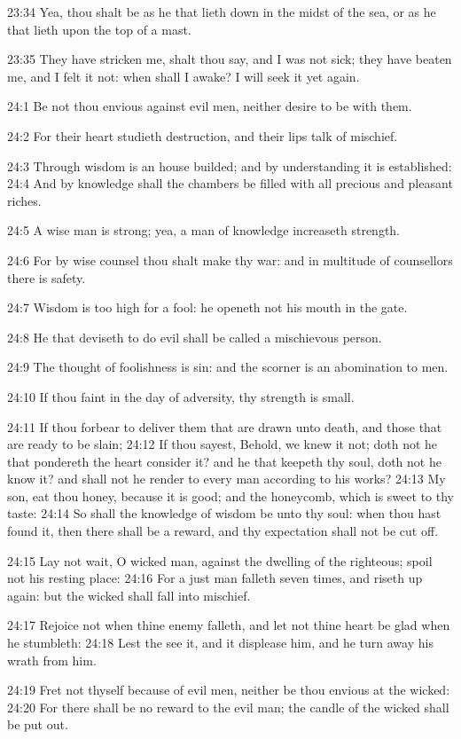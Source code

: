 23:34 Yea, thou shalt be as he that lieth down in the midst of the sea, or as he that lieth upon the top of a mast.

23:35 They have stricken me, shalt thou say, and I was not sick; they have beaten me, and I felt it not: when shall I awake? I will seek it yet again.

24:1 Be not thou envious against evil men, neither desire to be with them.

24:2 For their heart studieth destruction, and their lips talk of mischief.

24:3 Through wisdom is an house builded; and by understanding it is established: 24:4 And by knowledge shall the chambers be filled with all precious and pleasant riches.

24:5 A wise man is strong; yea, a man of knowledge increaseth strength.

24:6 For by wise counsel thou shalt make thy war: and in multitude of counsellors there is safety.

24:7 Wisdom is too high for a fool: he openeth not his mouth in the gate.

24:8 He that deviseth to do evil shall be called a mischievous person.

24:9 The thought of foolishness is sin: and the scorner is an abomination to men.

24:10 If thou faint in the day of adversity, thy strength is small.

24:11 If thou forbear to deliver them that are drawn unto death, and those that are ready to be slain; 24:12 If thou sayest, Behold, we knew it not; doth not he that pondereth the heart consider it? and he that keepeth thy soul, doth not he know it? and shall not he render to every man according to his works?  24:13 My son, eat thou honey, because it is good; and the honeycomb, which is sweet to thy taste: 24:14 So shall the knowledge of wisdom be unto thy soul: when thou hast found it, then there shall be a reward, and thy expectation shall not be cut off.

24:15 Lay not wait, O wicked man, against the dwelling of the righteous; spoil not his resting place: 24:16 For a just man falleth seven times, and riseth up again: but the wicked shall fall into mischief.

24:17 Rejoice not when thine enemy falleth, and let not thine heart be glad when he stumbleth: 24:18 Lest the \LORD see it, and it displease him, and he turn away his wrath from him.

24:19 Fret not thyself because of evil men, neither be thou envious at the wicked: 24:20 For there shall be no reward to the evil man; the candle of the wicked shall be put out.

